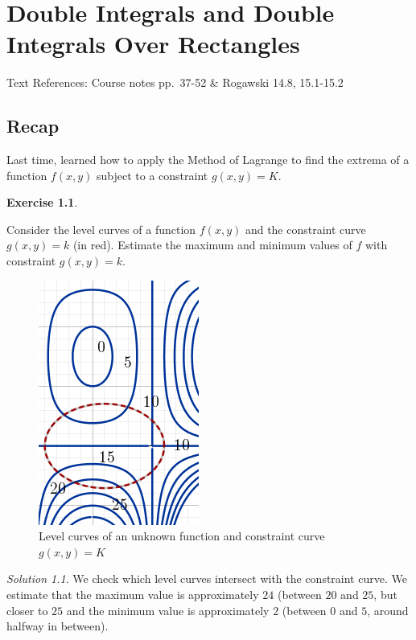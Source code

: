 \documentclass[
]{book}
\theoremstyle{definition}
\theoremstyle{definition}
\theoremstyle{definition}
\newtheorem{exercise}{Exercise}[chapter]
\theoremstyle{definition}
\theoremstyle{remark}
\newtheorem*{solution}{Solution}
\begin{document}
\hypertarget{lec-10}{%
\chapter{Double Integrals and Double Integrals Over Rectangles}\label{lec-10}}

Text References: Course notes pp.~37-52 \& Rogawski 14.8, 15.1-15.2

\hypertarget{recap-8}{%
\section{Recap}\label{recap-8}}

Last time, learned how to apply the Method of Lagrange to find the extrema of a function \(f(x,y)\) subject to a constraint \(g(x,y)=K\).

\begin{exercise}
\protect\hypertarget{exr:unlabeled-div-70}{}\label{exr:unlabeled-div-70}

Consider the level curves of a function \(f (x, y)\) and the constraint curve \(g(x, y) = k\) (in red). Estimate the maximum and minimum values of \(f\) with constraint \(g(x, y) = k\).

\begin{figure}

{\centering \includegraphics[width=0.3\linewidth]{images/lc-dashed-2} 

}

\caption{Level curves of an unknown function and constraint curve $g(x,y)=K$}\label{fig:unnamed-chunk-17}
\end{figure}

\end{exercise}

\begin{solution}

We check which level curves intersect with the constraint curve. We estimate that the maximum value is approximately \(24\) (between \(20\) and \(25\), but closer to \(25\) and the minimum value is approximately \(2\) (between \(0\) and \(5\), around halfway in between).

\end{solution}
\end{document}
